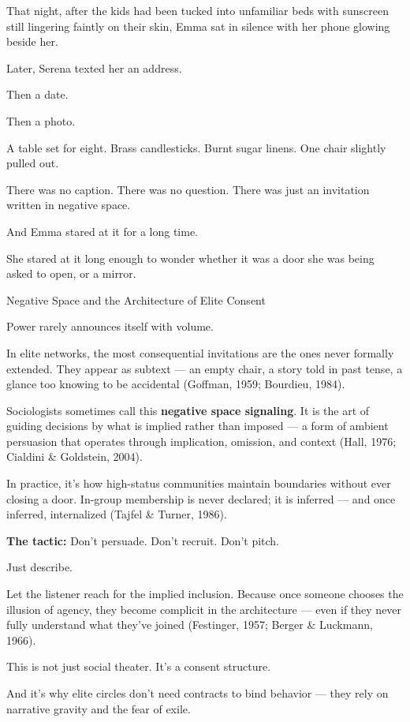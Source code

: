 That night, after the kids had been tucked into unfamiliar beds with sunscreen still lingering faintly 
on their skin, Emma sat in silence with her phone glowing beside her.

Later, Serena texted her an address.

Then a date.

Then a photo.

A table set for eight. Brass candlesticks. Burnt sugar linens.
One chair slightly pulled out.

There was no caption.
There was no question.
There was just an invitation written in negative space.

And Emma stared at it for a long time.

She stared at it long enough to wonder whether it was a door she was being asked to open,
or a mirror.

\medskip

\begin{PsychologicalSidebar}{Negative Space and the Architecture of Elite Consent}

  Power rarely announces itself with volume.
  
  In elite networks, the most consequential invitations are the ones never formally extended.  
  They appear as subtext — an empty chair, a story told in past tense, a glance too knowing to be accidental 
  (Goffman, 1959; Bourdieu, 1984).
  
  \medskip
  
  Sociologists sometimes call this \textbf{negative space signaling}.  
  It is the art of guiding decisions by what is implied rather than imposed — a form of ambient persuasion 
  that operates through implication, omission, and context (Hall, 1976; Cialdini \& Goldstein, 2004).  
  
  \medskip
  
  In practice, it’s how high-status communities maintain boundaries without ever closing a door.  
  In-group membership is never declared; it is inferred — and once inferred, internalized (Tajfel \& Turner, 1986).
  
  \medskip
  
  \textbf{The tactic:} Don’t persuade. Don’t recruit. Don’t pitch.
  
  \medskip
  
  Just describe.
  
  \medskip
  
  Let the listener reach for the implied inclusion.  
  Because once someone chooses the illusion of agency, they become complicit in the architecture —  
  even if they never fully understand what they’ve joined (Festinger, 1957; Berger \& Luckmann, 1966).
  
  \medskip
  
  This is not just social theater.  
  It’s a consent structure.

  \medskip
  
  And it’s why elite circles don’t need contracts to bind behavior —  
  they rely on narrative gravity and the fear of exile.
  
\end{PsychologicalSidebar}
  


